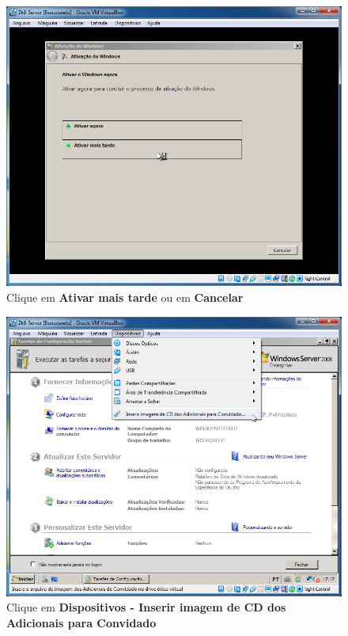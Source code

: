\documentclass[10pt]{article}
\begin{document}
\begin{figure}[H]
    \centering
    \caption{Clique em \textbf{Ativar mais tarde} ou em \textbf{Cancelar}}
    \label{fig:3129}
    \includegraphics[width=\linewidth]{images/ativacao_das_maquinas_virtuais/configuracao_inicial_das_maquinas_virtuais/029.png}
\end{figure}
\begin{figure}[H]
    \centering
    \caption{Clique em \textbf{Dispositivos - Inserir imagem de CD dos Adicionais para Convidado}}
    \label{fig:3130}
    \includegraphics[width=\linewidth]{images/ativacao_das_maquinas_virtuais/configuracao_inicial_das_maquinas_virtuais/030.png}
\end{figure}
\end{document}
